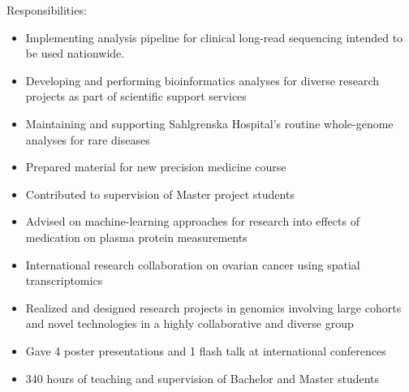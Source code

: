 \documentclass[10pt,a4paper,ragged2e,withhyper]{altacv}
\begin{document}
\begin{paracol}{2}
Responsibilities:
\begin{itemize}
  \item Implementing analysis pipeline for clinical long-read sequencing intended to be used nationwide.
  \item Developing and performing bioinformatics analyses for diverse research projects as part of scientific support services
  \item Maintaining and supporting Sahlgrenska Hospital's routine whole-genome analyses for rare diseases
\end{itemize}
\divider

\begin{itemize}
  \item Prepared material for new precision medicine course
  \item Contributed to supervision of Master project students
  \item Advised on machine-learning approaches for research into effects of medication on plasma protein measurements
\end{itemize}
\divider

\begin{itemize}
  \item International research collaboration on ovarian cancer using spatial transcriptomics
\end{itemize}

\divider

\begin{itemize}
  \item Realized and designed research projects in genomics involving large cohorts and novel technologies in a highly collaborative and diverse group
  \item Gave 4 poster presentations and 1 flash talk at international conferences
  \item 340 hours of teaching and supervision of Bachelor and Master students
\end{itemize}
\divider


\end{paracol}
\end{document}
